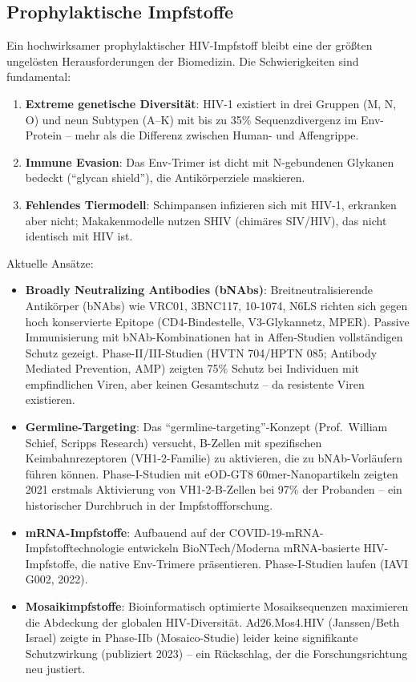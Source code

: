 ﻿\documentclass[a4paper,12pt]{article}
\theoremstyle{definition}
\begin{document}
\subsection{Prophylaktische Impfstoffe}

Ein hochwirksamer prophylaktischer HIV-Impfstoff bleibt eine der gr\"o\ss ten
ungelösten Herausforderungen der Biomedizin. Die Schwierigkeiten sind fundamental:
\begin{enumerate}
\item \textbf{Extreme genetische Diversit\"at}: HIV-1 existiert in drei Gruppen
      (M, N, O) und neun Subtypen (A--K) mit bis zu 35\% Sequenzdivergenz im
      Env-Protein -- mehr als die Differenz zwischen Human- und Affengrippe.
\item \textbf{Immune Evasion}: Das Env-Trimer ist dicht mit N-gebundenen Glykanen
      bedeckt (``glycan shield''), die Antikörperziele maskieren.
\item \textbf{Fehlendes Tiermodell}: Schimpansen infizieren sich mit HIV-1,
      erkranken aber nicht; Makakenmodelle nutzen SHIV (chimäres SIV/HIV),
      das nicht identisch mit HIV ist.
\end{enumerate}

Aktuelle Ans\"atze:
\begin{itemize}
\item \textbf{Broadly Neutralizing Antibodies (bNAbs)}: Breitneutralisierende
      Antik\"orper (bNAbs) wie VRC01, 3BNC117, 10-1074, N6LS richten sich gegen
      hoch konservierte Epitope (CD4-Bindestelle, V3-Glykannetz, MPER).
      Passive Immunisierung mit bNAb-Kombinationen hat in Affen-Studien vollst\"andigen
      Schutz gezeigt. Phase-II/III-Studien (HVTN 704/HPTN 085; Antibody Mediated
      Prevention, AMP) zeigten 75\% Schutz bei Individuen mit empfindlichen Viren,
      aber keinen Gesamtschutz -- da resistente Viren existieren.

\item \textbf{Germline-Targeting}: Das ``germline-targeting''-Konzept (Prof.\ William Schief,
      Scripps Research) versucht, B-Zellen mit spezifischen Keimbahnrezeptoren
      (VH1-2-Familie) zu aktivieren, die zu bNAb-Vorl\"aufern f\"uhren k\"onnen.
      Phase-I-Studien mit eOD-GT8 60mer-Nanopartikeln zeigten 2021 erstmals
      Aktivierung von VH1-2-B-Zellen bei 97\% der Probanden -- ein historischer
      Durchbruch in der Impfstoffforschung.

\item \textbf{mRNA-Impfstoffe}: Aufbauend auf der COVID-19-mRNA-Impfstofftechnologie
      entwickeln BioNTech/Moderna mRNA-basierte HIV-Impfstoffe, die native Env-Trimere
      pr\"asentieren. Phase-I-Studien laufen (IAVI G002, 2022).

\item \textbf{Mosaikimpfstoffe}: Bioinformatisch optimierte Mosaiksequenzen maximieren
      die Abdeckung der globalen HIV-Diversit\"at. Ad26.Mos4.HIV (Janssen/Beth Israel)
      zeigte in Phase-IIb (Mosaico-Studie) leider keine signifikante Schutzwirkung
      (publiziert 2023) -- ein R\"uckschlag, der die Forschungsrichtung neu justiert.
\end{itemize}
\end{document}
